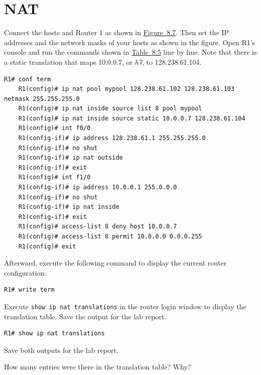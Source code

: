\documentclass{UTNetLab}
\begin{document}
\section{NAT}
	Connect the hosts and Router 1 as shown in \hyperref[fig:8.7]{Figure~8.7}. Then set the IP addresses and the network masks of your hosts as shown in the figure.
    Open R1's console and run the commands shown in \hyperref[tab:8.5]{Table~8.5} line by line. Note that there is a static translation that maps 10.0.0.7, or \textit{h7}, to 128.238.61.104.

    \newpage
    
    \begin{lstlisting}[language={cisco}, emph={mypool}, caption={NAT Router Configuration in \hyperref[fig:8.7]{Figure~8.7} (Table~8.5)\label{tab:8.5}}]
    R1# conf term
	R1(config)# ip nat pool mypool 128.238.61.102 128.238.61.103 netmask 255.255.255.0
	R1(config)# ip nat inside source list 8 pool mypool
	R1(config)# ip nat inside source static 10.0.0.7 128.238.61.104
	R1(config)# int f0/0
	R1(config-if)# ip address 128.238.61.1 255.255.255.0
	R1(config-if)# no shut
	R1(config-if)# ip nat outside
	R1(config-if)# exit
	R1(config)# int f1/0
	R1(config-if)# ip address 10.0.0.1 255.0.0.0
	R1(config-if)# no shut
	R1(config-if)# ip nat inside
	R1(config-if)# exit
	R1(config)# access-list 8 deny host 10.0.0.7
	R1(config)# access-list 8 permit 10.0.0.0 0.0.0.255
	R1(config)# exit
    \end{lstlisting}
	
	Afterward, execute the following command to display the current router configuration:
	
	\begin{lstlisting}[language={cisco}]
	R1# write term
	\end{lstlisting}

Execute \lstinline{show ip nat translations} in the router login window to display the translation table.
Save the output for the lab report.
	
	\begin{lstlisting}[language={cisco}]
	R1# show ip nat translations
	\end{lstlisting}
	
	Save both outputs for the lab report.
	\begin{report}
	\item How many entries were there in the translation table? Why?
	\end{report}
\end{document}
